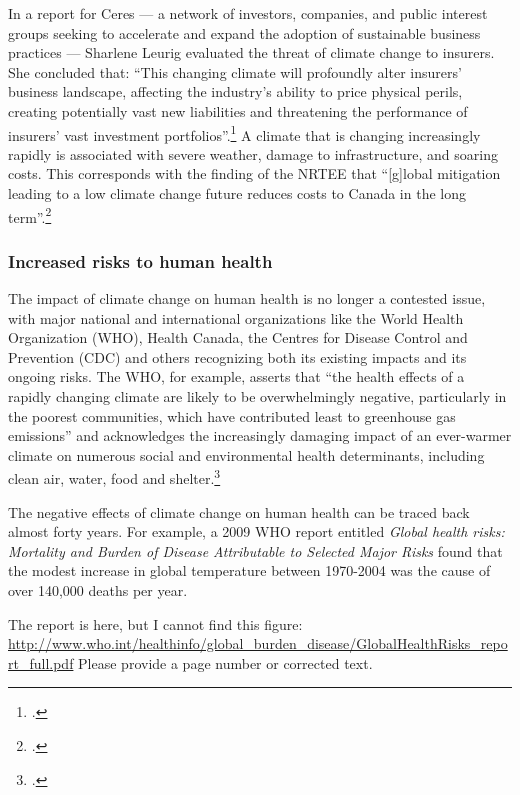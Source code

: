 In a report for Ceres --- a  network of investors, companies, and public interest groups seeking to accelerate and expand the adoption of sustainable business practices --- Sharlene Leurig evaluated the threat of climate change to insurers.
She concluded that: ``This changing climate will profoundly alter insurers' business landscape, affecting the industry's ability to price physical perils, creating potentially vast new liabilities and threatening the performance of insurers' vast investment portfolios''.\footcite[][p. 9]{ClimateRiskInsurers}
A climate that is changing increasingly rapidly is associated with severe weather, damage to infrastructure, and soaring costs.
This corresponds with the finding of the NRTEE that ``[g]lobal mitigation leading to a low climate change future reduces costs to Canada in the long term''.\footcite[][p. 16]{NRTEEPrice}


	\subsubsection{Increased risks to human health}



The impact of climate change on human health is no longer a contested issue, with major national and international organizations like the World Health Organization (WHO), Health Canada, the Centres for Disease Control and Prevention (CDC) and others recognizing both its existing impacts and its ongoing risks. 
The WHO, for example, asserts that ``the health effects of a rapidly changing climate are likely to be overwhelmingly negative, particularly in the poorest communities, which have contributed least to greenhouse gas emissions'' and acknowledges the increasingly damaging impact of an ever-warmer climate on numerous social and environmental health determinants, including clean air, water, food and shelter.\footcite[][]{WHOClimateHealth}



The negative effects of climate change on human health can be traced back almost forty years. 
For example, a 2009 WHO report entitled \emph{Global health risks: Mortality and Burden of Disease Attributable to Selected Major Risks} found that the modest increase in global temperature between 1970-2004 was the cause of over 140,000 deaths per year.

\begin{vcom}
The report is here, but I cannot find this figure: \url{http://www.who.int/healthinfo/global_burden_disease/GlobalHealthRisks_report_full.pdf}
Please provide a page number or corrected text.
\end{vcom}

